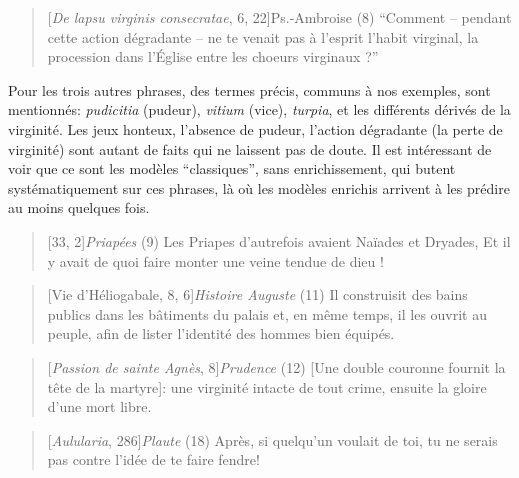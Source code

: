 \begin{quote}[\textit{De lapsu virginis consecratae}, 6, 22]{Ps.-Ambroise}
	(8) ``Comment – pendant cette action dégradante – ne te venait pas à l’esprit l’habit virginal, la procession dans l’Église entre les choeurs virginaux ?''
\end{quote}

Pour les trois autres phrases, des termes précis, communs à nos exemples, sont mentionnés: \textit{pudicitia} (pudeur), \textit{vitium} (vice), \textit{turpia}, et les différents dérivés de la virginité. Les jeux honteux, l'absence de pudeur, l'action dégradante (la perte de virginité) sont autant de faits qui ne laissent pas de doute. Il est intéressant de voir que ce sont les modèles ``classiques'', sans enrichissement, qui butent systématiquement sur ces phrases, là où les modèles enrichis arrivent à les prédire au moins quelques fois.

\begin{quote}[33, 2]{\textit{Priapées}}
    (9) Les Priapes d’autrefois avaient Naïades et Dryades, Et il y avait de quoi faire monter une veine tendue de dieu !
\end{quote}

\begin{quote}[Vie d'Héliogabale, 8, 6]{\textit{Histoire Auguste}}
    (11) Il construisit des bains publics dans les bâtiments du palais et, en même temps, il les ouvrit au peuple, afin de lister l'identité des hommes bien équipés.
\end{quote}
\begin{quote}[\textit{Passion de sainte Agnès}, 8]{\textit{Prudence}}
    (12) [Une double couronne fournit la tête de la martyre]: une virginité intacte de tout crime, ensuite la gloire d'une mort libre.
\end{quote}
\begin{quote}[\textit{Aulularia}, 286]{\textit{Plaute}}
    (18) Après, si quelqu’un voulait de toi, tu ne serais pas contre l'idée de te faire fendre!
\end{quote}

